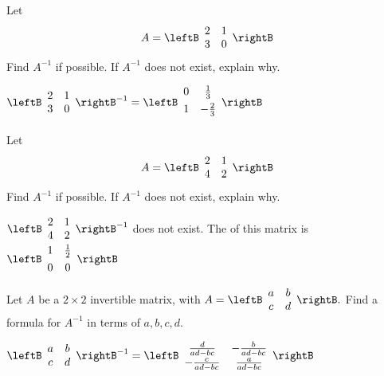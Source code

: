 \begin{enumialphparenastyle}
\begin{ex}Let
\begin{equation*}
A=\leftB
\begin{array}{rr}
2 & 1 \\
3 & 0
\end{array}
\rightB 
\end{equation*}
Find $A^{-1}$ if possible. If $A^{-1}$ does not exist, explain why.
\begin{sol}
$\leftB
\begin{array}{cc}
2 & 1 \\
3 & 0
\end{array}
\rightB^{-1}= \leftB
\begin{array}{cc}
0 & \vspace{0.05in}\frac{1}{3} \\
1 & -\vspace{0.05in}\frac{2}{3}
\end{array}
\rightB$
\end{sol}
\end{ex}

\begin{ex}Let
\begin{equation*}
A=\leftB
\begin{array}{rr}
2 & 1 \\
4 & 2
\end{array}
\rightB 
\end{equation*}
Find $A^{-1}$ if possible. If $A^{-1}$ does not exist, explain why. 
\begin{sol}
$\leftB
\begin{array}{cc}
2 & 1 \\
4 & 2
\end{array}
\rightB^{-1}$ does not exist. The \rref\; of this matrix
is $\leftB
\begin{array}{cc}
1 & \vspace{0.05in}\frac{1}{2} \\
0 & 0
\end{array}
\rightB$
\end{sol}
\end{ex}

\begin{ex}Let $A$ be a $2\times 2$ invertible matrix, with $A=\leftB
\begin{array}{cc}
a & b \\
c & d
\end{array}
\rightB .$ Find a formula for $A^{-1}$ in terms of $a,b,c,d$.
\begin{sol}
$\leftB
\begin{array}{cc}
a & b \\
c & d
\end{array}
\rightB^{-1}= \leftB
\begin{array}{cc}
\frac{d}{ad-bc} & -\frac{b}{ad-bc} \\
-\frac{c}{ad-bc} & \frac{a}{ad-bc}
\end{array}
\rightB$
\end{sol}
\end{ex}


\end{enumialphparenastyle}
